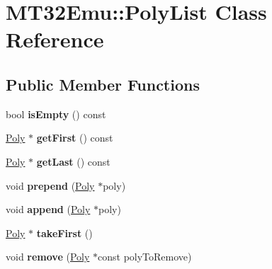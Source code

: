 \hypertarget{classMT32Emu_1_1PolyList}{\section{M\-T32\-Emu\-:\-:Poly\-List Class Reference}
\label{classMT32Emu_1_1PolyList}
}
\subsection*{Public Member Functions}
\begin{DoxyCompactItemize}
\item 
\hypertarget{classMT32Emu_1_1PolyList_a7fc92d093c4700846b65d0877779fb84}{bool {\bfseries is\-Empty} () const }\label{classMT32Emu_1_1PolyList_a7fc92d093c4700846b65d0877779fb84}

\item 
\hypertarget{classMT32Emu_1_1PolyList_a95f9ea79fdaa4fb59b2b5f488d5473eb}{\hyperlink{classMT32Emu_1_1Poly}{Poly} $\ast$ {\bfseries get\-First} () const }\label{classMT32Emu_1_1PolyList_a95f9ea79fdaa4fb59b2b5f488d5473eb}

\item 
\hypertarget{classMT32Emu_1_1PolyList_a701f2c15d53f9d6736f1213dbbab9224}{\hyperlink{classMT32Emu_1_1Poly}{Poly} $\ast$ {\bfseries get\-Last} () const }\label{classMT32Emu_1_1PolyList_a701f2c15d53f9d6736f1213dbbab9224}

\item 
\hypertarget{classMT32Emu_1_1PolyList_a0f6407a487b79dc1dcc0b810f0f32b31}{void {\bfseries prepend} (\hyperlink{classMT32Emu_1_1Poly}{Poly} $\ast$poly)}\label{classMT32Emu_1_1PolyList_a0f6407a487b79dc1dcc0b810f0f32b31}

\item 
\hypertarget{classMT32Emu_1_1PolyList_a6cb33bdab9d0146a3baff5a6feae9e5a}{void {\bfseries append} (\hyperlink{classMT32Emu_1_1Poly}{Poly} $\ast$poly)}\label{classMT32Emu_1_1PolyList_a6cb33bdab9d0146a3baff5a6feae9e5a}

\item 
\hypertarget{classMT32Emu_1_1PolyList_a05b7549d097f22041dff5213589ee49d}{\hyperlink{classMT32Emu_1_1Poly}{Poly} $\ast$ {\bfseries take\-First} ()}\label{classMT32Emu_1_1PolyList_a05b7549d097f22041dff5213589ee49d}

\item 
\hypertarget{classMT32Emu_1_1PolyList_a928cf18b2322eaad315d0e202c950570}{void {\bfseries remove} (\hyperlink{classMT32Emu_1_1Poly}{Poly} $\ast$const poly\-To\-Remove)}\label{classMT32Emu_1_1PolyList_a928cf18b2322eaad315d0e202c950570}

\end{DoxyCompactItemize}
